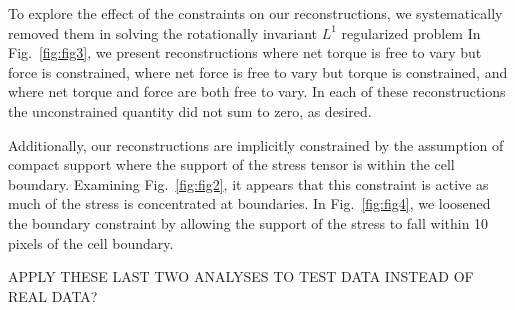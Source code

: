 \documentclass[aps,prl,reprint,twocolumn,groupedaddress,showpacs]{revtex4-1}
\begin{document}
To explore the effect of the constraints on our reconstructions, we
systematically removed them in solving the rotationally invariant
$L^1$ regularized problem In Fig.~\ref{fig:fig3}, we present
reconstructions where net torque is free to vary but force is
constrained, where net force is free to vary but torque is
constrained, and where net torque and force are both free to vary. In
each of these reconstructions the unconstrained quantity did not sum
to zero, as desired.

Additionally, our reconstructions are implicitly constrained by the
assumption of compact support where the support of the stress tensor
is within the cell boundary. Examining Fig.~\ref{fig:fig2}, it appears
that this constraint is active as much of the stress is concentrated
at boundaries. In Fig.~\ref{fig:fig4}, we loosened the boundary
constraint by allowing the support of the stress to fall within 10
pixels of the cell boundary.


APPLY THESE LAST TWO ANALYSES TO TEST DATA INSTEAD OF REAL DATA?
\end{document}
